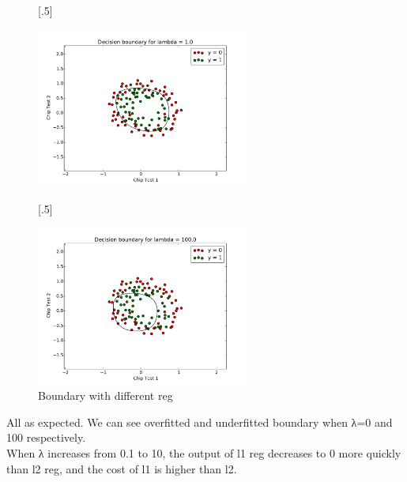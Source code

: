 \documentclass{article}
\begin{document}
\begin{figure}[H]



	

[.5\linewidth]{

	\includegraphics[width=7cm]{part1/fig4_lambda1.pdf}

	}[.5\linewidth]{

	\includegraphics[width=7cm]{part1/fig4_lambda100.pdf}

	}
\caption{Boundary with different reg}

\end{figure}
All as expected. We can see overfitted and underfitted boundary when λ=0 and 100 respectively. \\
When λ increases from 0.1 to 10, the output of l1 reg decreases to 0 more quickly than l2 reg, and the cost of l1 is higher than l2.
\end{document}
